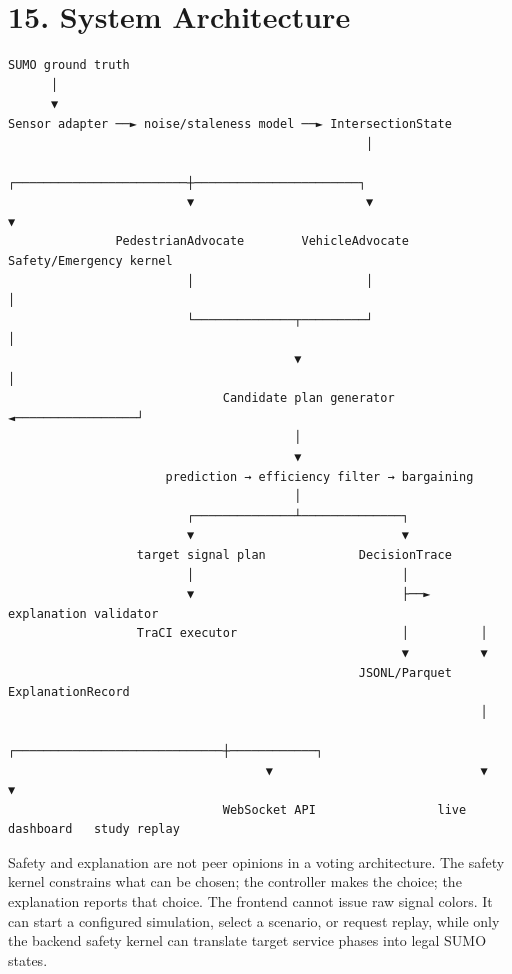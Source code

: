 \documentclass[
  english,
  11pt,
  a4paper,
]{article}
\begin{document}
\section{15. System Architecture}\label{system-architecture}

\begin{verbatim}
SUMO ground truth
      │
      ▼
Sensor adapter ──► noise/staleness model ──► IntersectionState
                                                  │
                         ┌────────────────────────┼───────────────────────┐
                         ▼                        ▼                       ▼
               PedestrianAdvocate        VehicleAdvocate       Safety/Emergency kernel
                         │                        │                       │
                         └──────────────┬─────────┘                       │
                                        ▼                                │
                              Candidate plan generator ◄─────────────────┘
                                        │
                                        ▼
                      prediction → efficiency filter → bargaining
                                        │
                         ┌──────────────┴──────────────┐
                         ▼                             ▼
                  target signal plan             DecisionTrace
                         │                             │
                         ▼                             ├──► explanation validator
                  TraCI executor                       │          │
                                                       ▼          ▼
                                                 JSONL/Parquet  ExplanationRecord
                                                                  │
                                    ┌─────────────────────────────┼────────────┐
                                    ▼                             ▼            ▼
                              WebSocket API                 live dashboard   study replay
\end{verbatim}

Safety and explanation are not peer opinions in a voting architecture.
The safety kernel constrains what can be chosen; the controller makes
the choice; the explanation reports that choice. The frontend cannot
issue raw signal colors. It can start a configured simulation, select a
scenario, or request replay, while only the backend safety kernel can
translate target service phases into legal SUMO states.
\end{document}

